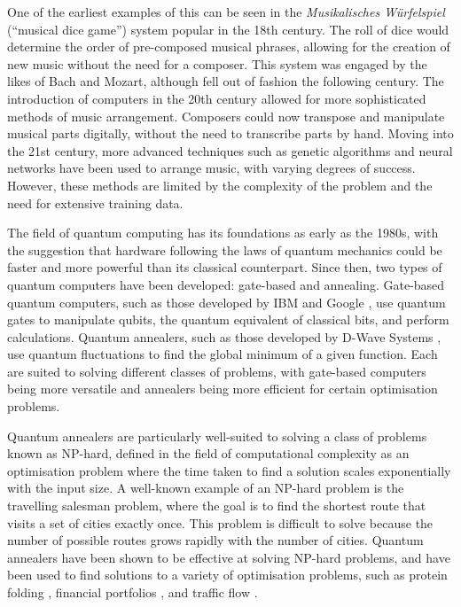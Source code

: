 \documentclass[aps,pra,12pt,onecolumn]{revtex4-2}
\begin{document}
One of the earliest examples of this can be seen in the \textit{Musikalisches Würfelspiel} (``musical dice game'') system popular in the 18th century. The roll of dice would determine the order of pre-composed musical phrases, allowing for the creation of new music without the need for a composer. This system was engaged by the likes of Bach and Mozart, although fell out of fashion the following century.
The introduction of computers in the 20th century allowed for more sophisticated methods of music arrangement. Composers could now transpose and manipulate musical parts digitally, without the need to transcribe parts by hand. Moving into the 21st century, more advanced techniques such as genetic algorithms and neural networks have been used to arrange music, with varying degrees of success. However, these methods are limited by the complexity of the problem and the need for extensive training data.

The field of quantum computing has its foundations as early as the 1980s, with the suggestion that hardware following the laws of quantum mechanics could be faster and more powerful than its classical counterpart. Since then, two types of quantum computers have been developed: gate-based and annealing. Gate-based quantum computers, such as those developed by IBM \cite{ibm} and Google \cite{google}, use quantum gates to manipulate qubits, the quantum equivalent of classical bits, and perform calculations. Quantum annealers, such as those developed by D-Wave Systems \cite{d-wave}, use quantum fluctuations to find the global minimum of a given function. Each are suited to solving different classes of problems, with gate-based computers being more versatile and annealers being more efficient for certain optimisation problems. 

Quantum annealers are particularly well-suited to solving a class of problems known as NP-hard, defined in the field of computational complexity as an optimisation problem where the time taken to find a solution scales exponentially with the input size. A well-known example of an NP-hard problem is the travelling salesman problem, where the goal is to find the shortest route that visits a set of cities exactly once. This problem is difficult to solve because the number of possible routes grows rapidly with the number of cities. Quantum annealers have been shown to be effective at solving NP-hard problems, and have been used to find solutions to a variety of optimisation problems, such as protein folding \cite{perdomo-ortiz_protein_2012}, financial portfolios \cite{phillipson_portfolio_2021}, and traffic flow \cite{inoue_traffic_2021}.
\end{document}
